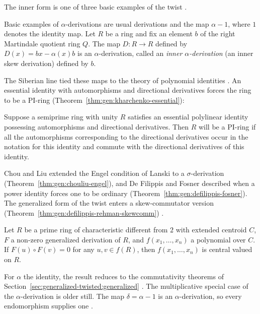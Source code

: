 The inner form is one of three basic examples of the twist
\cite[p.~885]{DeFilippisFosner2012}.

\begin{remark}\label{rem:gen:alpha-examples}
Basic examples of $\alpha$-derivations are usual derivations and the map
$\alpha-1$, where $1$ denotes the identity map.
Let $R$ be a ring and fix an element $b$ of the right Martindale quotient
ring $Q$.
The map $D\colon R\to R$ defined by $D(x)=bx-\alpha(x)b$ is an
$\alpha$-derivation, called an
\emph{inner $\alpha$-derivation} (an inner skew derivation) defined by $b$.
\end{remark}

The Siberian line tied these maps to the theory of polynomial identities
\cite[p.~1045]{KharchenkoPopov1991}. An essential identity with
automorphisms and directional derivatives forces the ring to be a PI-ring (Theorem~\ref{thm:gen:kharchenko-essential}):

\begin{theorem}\label{thm:gen:kharchenko-essential}
Suppose a semiprime ring with unity $R$ satisfies an essential polylinear
identity possessing automorphisms and directional derivatives. Then $R$ will
be a PI-ring if all the automorphisms corresponding to the directional
derivatives occur in the notation for this identity and commute with the
directional derivatives of this identity.
\end{theorem}

Chou and Liu extended the Engel condition of Lanski to a $\sigma$-derivation
(Theorem~\ref{thm:gen:chouliu-engel}), and De Filippis and Fosner described
when a power identity forces one to be ordinary
(Theorem~\ref{thm:gen:defilippis-fosner}). The generalized form of the
twist enters a skew-commutator version (Theorem~\ref{thm:gen:defilippis-rehman-skewcomm})
\cite[p.~843]{DeFilippisRehman2010}.\begin{theorem}\label{thm:gen:defilippis-rehman-skewcomm}
Let $R$ be a prime ring of characteristic different from $2$ with extended
centroid $C$, $F$ a non-zero generalized derivation of $R$, and
$f(x_{1},\dots,x_{n})$ a polynomial over $C$. If $F(u)\circ F(v)=0$ for any
$u,v\in f(R)$, then $f(x_{1},\dots,x_{n})$ is central valued on $R$.
\end{theorem}

For $\alpha$ the identity, the result reduces to the commutativity theorems
of Section~\ref{sec:generalized-twisted:generalized} \cite[p.~1148]{Hvala1998}.
The multiplicative special case of the $\alpha$-derivation is older still.
The map $\delta=\alpha-1$ is an $\alpha$-derivation, so every endomorphism
supplies one \cite[p.~885]{DeFilippisFosner2012}.

